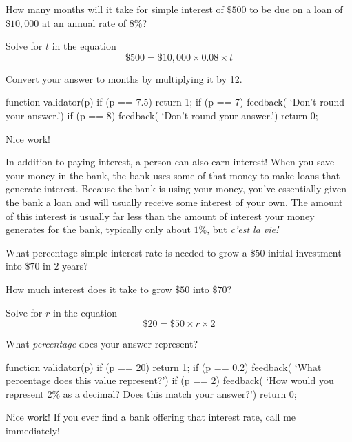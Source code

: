 \documentclass{ximera}
\begin{document}
\begin{question}
How many months will it take for simple interest of $\$500$ to be due on a loan of $\$10,000$ at an annual rate of $8\%$? 	

\begin{solution}
\begin{hint}
Solve for $t$ in the equation
\begin{equation*}\$500=\$10,000\times 0.08\times t\end{equation*}
\end{hint}
\begin{hint}
Convert your answer to months by multiplying it by 12.
\end{hint}
\begin{expression-answer}
function validator(p) {
    if (p == 7.5)
      return 1;
    if (p == 7) {feedback( `Don't round your answer.')
    }
    if (p == 8) {feedback( `Don't round your answer.')
    }
      return 0;
  }
\end{expression-answer}
\end{solution}	

Nice work!
\end{question}

In addition to paying interest, a person can also earn interest! When you save your money in the bank, the bank uses some of that money to make loans that generate interest. Because the bank is using your money, you've essentially given the bank a loan and will usually receive some interest of your own. The amount of this interest is usually far less than the amount of interest your money generates for the bank, typically only about $1\%$, but \emph{c'est la vie!}

\begin{question}
What percentage simple interest rate is needed to grow a $\$50$ initial investment into $\$70$ in 2 years?

\begin{solution}
\begin{hint}
How much interest does it take to grow $\$50$ into $\$70$?
\end{hint}
\begin{hint}
Solve for $r$ in the equation
\begin{equation*}\$20=\$50\times r\times 2\end{equation*}
\end{hint}
\begin{hint}
What \emph{percentage} does your answer represent?
\end{hint}
\begin{expression-answer}
function validator(p) {
    if (p == 20)
      return 1;
    if (p == 0.2) {feedback( `What percentage does this value represent?')
    }
    if (p == 2) {feedback( `How would you represent $2\%$ as a decimal? Does this match your answer?')
    }
      return 0;
  }
\end{expression-answer}
\end{solution}	

Nice work! If you ever find a bank offering that interest rate, call me immediately!
\end{question}
\end{document}
